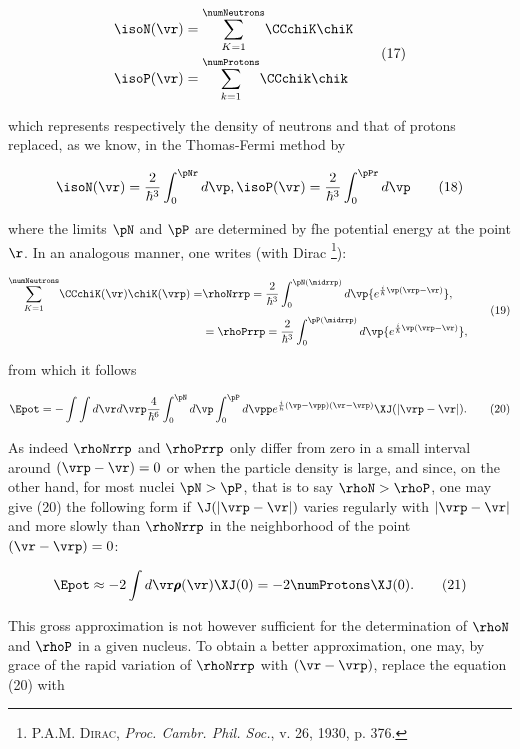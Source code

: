 \documentclass{article}
\newcommand{\var}[1]{\pmb{#1}}
\newcommand{\const}[1]{#1}
\newcommand{\serXY}[3]{\underset{#1}{\overset{#2}{\sum}} #3}
\newcommand{\intXY}[3]{\int_{#1}^{#2}{#3}}
\newcommand{\nequ}[2]{
\begin{equation*}
#1
\tag{#2}
\end{equation*}
}
\begin{document}
\renewcommand{\exp}[1]{{\const{e}^{#1}}}

\nequ{
\begin{split}
   \isoN(\vr) &= \serXY{K=1}{\numNeutrons}{\CCchiK\chiK} \\
   \isoP(\vr) &= \serXY{k=1}{\numProtons}{\CCchik\chik}
\end{split}
}{17}

which represents respectively the density of neutrons and that of protons replaced, as we know, in the Thomas-Fermi method by

\nequ{
  \isoN(\vr) = \frac{2}{\hbar^3}\intXY{0}{\pNr}{d\vp},
  \isoP(\vr) = \frac{2}{\hbar^3}\intXY{0}{\pPr}{d\vp}
}{18}

where the limits $\pN$ and $\pP$ are determined by fhe potential energy at the point $\r$. In an analogous manner, one writes (with Dirac \footnote{\textsc{P.A.M. Dirac}, \textit{Proc. Cambr. Phil. Soc.}, v. 26, 1930, p. 376.}):

\nequ{
\begin{split}
\serXY{K=1}{\numNeutrons}{
  \CCchiK(\vr)\chiK(\vrp) 
} = & \rhoNrrp = \frac{2}{\hbar^3}\intXY{0}{\pN(\midrrp)}{
  d\vp\exp{\frac{\const{i}}{\hbar}\vp(\vrp - \vr)}
}, \\
& = \rhoPrrp = \frac{2}{\hbar^3}\intXY{0}{\pP(\midrrp)}{
  d\vp\exp{\frac{\const{i}}{\hbar}\vp(\vrp - \vr)}
},
\end{split}
}{19}

from which it follows

\nequ{
  \Epot = -\int\int d\vr d\vrp \frac{4}{\hbar^6}\intXY{0}{\pN}{
    d\vp\intXY{0}{\pP}{d\vpp}{
      \exp{\frac{\const{i}}{\hbar}(\vp - \vpp)(\vr - \vrp)}
      \XJ(|\vrp - \vr|)
    }
  }.
}{20}

As indeed $\rhoNrrp$ and $\rhoPrrp$ only differ from zero in a small interval around $(\vrp - \vr) = 0$ or when the particle density is large, and since, on the other hand, for most nuclei $\pN > \pP$, that is to say $\rhoN > \rhoP$, one may give (20) the following form if $\J(|\vrp - \vr|)$ varies regularly with $|\vrp - \vr|$ and more slowly than $\rhoNrrp$ in the neighborhood of the point $(\vr - \vrp) =0$:

\nequ{
\Epot \approx -2\int d\vr \var{\rho}(\vr)\XJ(0) = -2\numProtons\XJ(0).
}{21}

This gross approximation is not however sufficient for the determination of $\rhoN$ and $\rhoP$ in a given nucleus. To obtain a better approximation, one may, by grace of the rapid variation of $\rhoNrrp$ with $(\vr - \vrp)$, replace the equation (20) with
\end{document}
